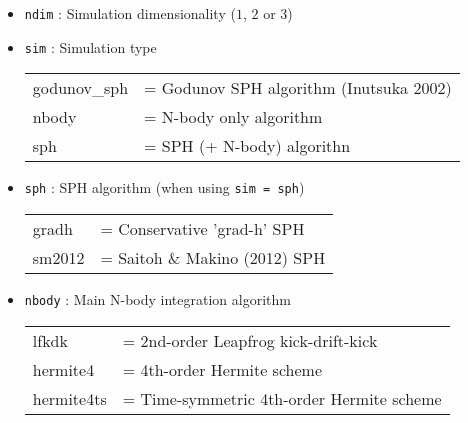\documentclass[a4paper]{article}
\newcommand{\var}[1]{\texttt{#1}}
\begin{document}
\begin{itemize}

\item \var{ndim} : Simulation dimensionality ($1$, $2$ or $3$)

\item \var{sim} : Simulation type \vspace{0.1cm} \\
\begin{tabular}{ll}
godunov\_sph      & = Godunov SPH algorithm (Inutsuka 2002) \\
nbody             & = N-body only algorithm \\
sph               & = SPH (+ N-body) algorithn 
\end{tabular}

\item \var{sph} : SPH algorithm (when using \var{sim = sph}) \\
\begin{tabular}{ll}
gradh    & = Conservative 'grad-h' SPH \\
sm2012   & = Saitoh \& Makino (2012) SPH
\end{tabular}

\item \var{nbody} : Main N-body integration algorithm \\
\begin{tabular}{ll}
lfkdk        & = 2nd-order Leapfrog kick-drift-kick \\
hermite4     & = 4th-order Hermite scheme \\
hermite4ts   & = Time-symmetric 4th-order Hermite scheme
\end{tabular}


\end{itemize}
\end{document}
